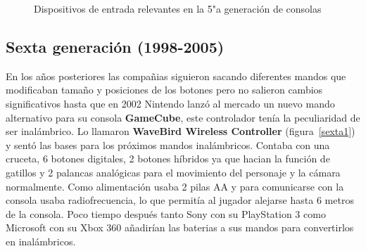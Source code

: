 \begin{figure}[t]
     \hfill
\hfill
     \caption{Dispositivos de entrada relevantes en la 5"a  generaci\'on de consolas}
     \label{fig:quinta}
   \end{figure}


\subsection{Sexta generaci\'on (1998-2005)}

En los a\~nos posteriores las compa\~nias siguieron sacando diferentes mandos que modificaban tama\~no y posiciones de los botones pero no salieron cambios significativos hasta que en 2002 Nintendo lanz\'o al mercado un nuevo mando alternativo para su consola \textbf{GameCube}, este controlador ten\'ia la peculiaridad de ser inal\'ambrico. Lo llamaron \textbf{WaveBird Wireless Controller} (figura~\ref{sexta1}) y sent\'o las bases para los pr\'oximos mandos inal\'ambricos. Contaba con una cruceta, 6 botones digitales, 2 botones h\'ibridos ya que hacian la funci\'on de gatillos y 2 palancas anal\'ogicas para el movimiento del personaje y la c\'amara normalmente. Como alimentaci\'on usaba 2 pilas AA y para comunicarse con la consola usaba radiofrecuencia, lo que permit\'ia al jugador alejarse hasta 6 metros de la consola. Poco tiempo despu\'es tanto Sony con su PlayStation 3 como Microsoft con su Xbox 360 a\~nadir\'ian las baterias a sus mandos para convertirlos en inal\'ambricos. \\


